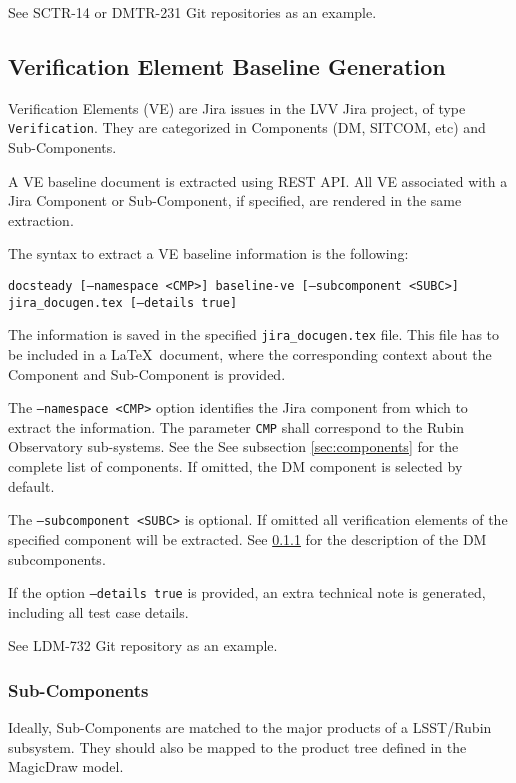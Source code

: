 \documentclass[DM]{lsstdoc}
\begin{document}
See SCTR-14 or DMTR-231 Git repositories as an example.



\subsection{Verification Element Baseline Generation}

Verification Elements (VE) are Jira issues in the LVV Jira project, of type \texttt{Verification}.
They are categorized in Components (DM, SITCOM, etc) and Sub-Components.

A VE baseline document is extracted using REST API.
All VE associated with a Jira Component or Sub-Component, if specified, are rendered in the same extraction.

The syntax to extract a VE baseline information is the following:

\texttt{docsteady [--namespace <CMP>] baseline-ve [--subcomponent <SUBC>] jira\_docugen.tex [--details true]}

The information is saved in the specified \texttt{jira\_docugen.tex} file.
This file has to be included in a \LaTeX~document, where the corresponding context about the Component and Sub-Component is provided.

The \texttt{--namespace <CMP>} option identifies the Jira component from which to extract the information.
The parameter \texttt{CMP} shall correspond to the Rubin Observatory sub-systems.
See the See subsection \ref{sec:components} for the complete list of components.
If omitted, the DM component is selected by default.

The \texttt{--subcomponent <SUBC>} is optional. If omitted all verification elements of the specified component will be extracted. 
See \ref{sec:subcomp} for the description of the DM subcomponents.

If the option \texttt{--details true} is provided, an extra technical note is generated, including all test case details.

See LDM-732 Git repository as an example.


\subsubsection{Sub-Components}\label{sec:subcomp}

Ideally, Sub-Components are matched to the major products of a LSST/Rubin subsystem. 
They should also be mapped to the product tree defined in the MagicDraw model.
\end{document}

